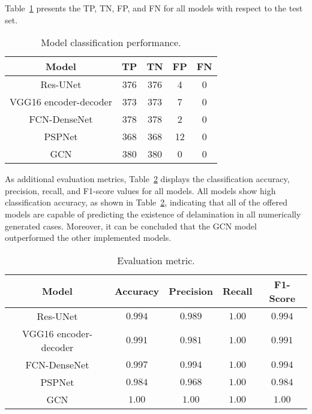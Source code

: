 Table~\ref{tab:table_performance} presents the TP, TN, FP, and FN for all models with respect to the test set.
\begin{table}[]
	\centering
	\caption{Model classification performance.}
	\label{tab:table_performance}
	\begin{tabular}{ccccc} \hline
		Model& TP & TN & FP & FN \\ \hline
		Res-UNet & 376 & 376 & 4 & 0 \\ 
		VGG16 encoder-decoder & 373 & 373 & 7 & 0 \\ 
		FCN-DenseNet & 378 & 378 & 2 & 0 \\ 
		PSPNet & 368 & 368 & 12 & 0 \\ 
		GCN & 380 & 380 & 0 & 0 \\ \hline
	\end{tabular}	
\end{table}

As additional evaluation metrics, Table~\ref{tab:evaluation_metric} displays the classification accuracy, precision, recall, and F1-score values for all models.
All models show high classification accuracy, as shown in Table~\ref{tab:evaluation_metric}, indicating that all of the offered models are capable of predicting the existence of delamination in all numerically generated cases.
Moreover, it can be concluded that the GCN model outperformed the other implemented models.
\begin{table}[]
	\centering
	\caption{Evaluation metric.}
	\label{tab:evaluation_metric}
	\resizebox{\textwidth}{!}
	{
		\begin{tabular}{ccccc} \hline
			Model& Accuracy & Precision & Recall & F1-Score \\ \hline
			Res-UNet & \(0.994\) & \(0.989\) & \(1.00\) & \(0.994\) \\ 
			VGG16 encoder-decoder & \(0.991\) & \(0.981\) & \(1.00\) & \(0.991\)\\ 
			FCN-DenseNet & \(0.997\) & \(0.994\) & \(1.00\) & \(0.994\) \\ 
			PSPNet & \(0.984\) & \(0.968\) & \(1.00\) & \(0.984\) \\ 
			GCN & \(1.00\) & \(1.00\) & \(1.00\) & \(1.00\) \\ \hline
		\end{tabular}
	}
\end{table}

